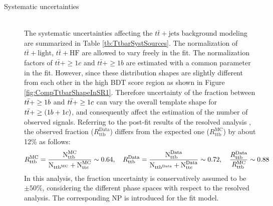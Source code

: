\begin{description}
  \item[Systematic uncertainties] \mbox{}\\
    The systematic uncertainties affecting the $t\bar{t}+\text{jets}$ background modeling are summarized in Table \ref{tb:TtbarSystSources}. 
    The normalization of $t\bar{t}+\text{light}$, $t\bar{t}+\text{HF}$ are allowed to vary freely in the fit. The normalization factors of $t\bar{t}+\geq1c$ and $t\bar{t}+\geq1b$ are estimated with a common parameter in the fit. However, since these distribution shapes are slightly different from each other in the high BDT score region as shown in Figure \ref{fig:CompTtbarShapeInSR1}. Therefore uncertainty of the fraction between $t\Bar{t}+ \geq 1b$ and $t\Bar{t}+ \geq 1c$ can vary the overall template shape for $t\Bar{t}+ \geq (1b + 1c)$, and consequently affect the estimation of the number of observed signals. Referring to the post-fit results of the resolved analysis \cite{HDBS-2021-02}, the observed fraction ($R_{\text{ttb}}^{\text{Data}}$) differs from the expected one ($R_{\text{ttb}}^{\text{MC}}$) by about 12\% as follows:
    \begin{alignat}{1}
        R_{\text{ttb}}^{\text{MC}} = \frac{\text{N}_{\text{ttb}}^{\text{MC}}}{\text{N}_{\text{ttb}^{\text{MC}}} + \text{N}_{\text{ttc}}^{\text{MC}}} \sim 0.64,
        \quad R_{\text{ttb}}^{\text{Data}} = \frac{\text{N}_{\text{ttb}}^{\text{Data}}}{\text{N}_{\text{ttb}^{\text{Data}}} + \text{N}_{\text{ttc}}^{\text{Data}}} & \sim 0.72,
        \quad \frac{R_{\text{ttb}}^{\text{Data}}}{R_{\text{ttb}}^{\text{MC}}} \sim 0.88 \notag
    \end{alignat}
    In this analysis, the fraction uncertainty is conservatively assumed to be $\pm 50\%$, considering the different phase spaces with respect to the resolved analysis. The corresponding NP is introduced for the fit model.


\end{description}
